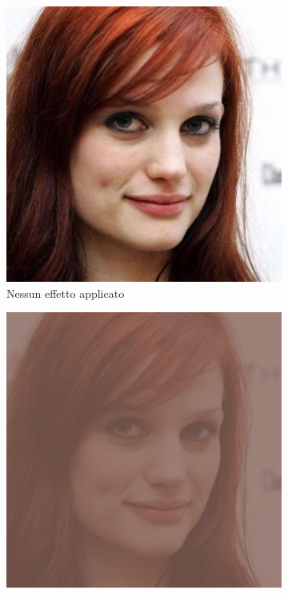 \begin{figure}[ht]
\begin{subfigure}[t]{0.18\textwidth}
\includegraphics[width=\textwidth]{./Images/preprocessed.jpg}
\caption{Nessun effetto applicato}
\label{sfig:corruption_contrast}
\end{subfigure}\hfill
\begin{subfigure}[t]{0.18\textwidth}
\includegraphics[width=\textwidth]{./Images/contrast_severity_0.2.jpg}

\end{subfigure}
\end{figure}
